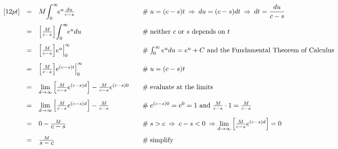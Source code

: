 \documentclass{article}
\theoremstyle{definition}
\begin{document}
\begin{equation*}
\begin{array}{lllll}
[12pt]                                                                                 %
&=&  M \mathlarger{\int}_0^\infty \! e^u \frac{du}{c-s}       &\quad  \mathrel{\#} u = (c-s)t  \: \Rightarrow \: du = (c-s) dt \: \Rightarrow \: dt = \dfrac{du}{c-s}                                                         \\     
[12pt]                                                                                %
&=& \Big [ \frac{M}{c-s} \Big ] \mathlarger{\int}_0^\infty \! e^u du                                    &\quad  \mathrel{\#} \text{neither $c$ or $s$ depends on $t$}                                                                \\     
[12pt]                                                                                %
&=& \Big [ \frac{M}{c-s} \Big ] e^u \Big |_0^\infty              &\quad  \mathrel{\#} \int_0^\infty e^u du = e^u +C \text{ and the Fundamental Theorem of Calculus}                                                  \\     
[12pt]                                                                                %
&=& \Big [ \frac{M}{c-s} \Big ]  e^{(c-s)t} \Big |_0^\infty     &\quad  \mathrel{\#} u = (c-s)t                                                                                                                                                                \\
[12pt]                                                                                %
&=& \lim\limits_{d \to \infty}\Big [\frac{M}{c-s} e^{(c-s)d} \Big ] - \frac{M}{c - s}e^{(c-s)0}  &\quad \mathrel{\#} \text{evaluate at the limits}                                                                                     \\
[12pt]                                                                                %
&=& \lim\limits_{d \to \infty}\Big [\frac{M}{c-s} e^{(c-s)d} \Big ] - \frac{M}{c - s}                 &\quad  \mathrel{\#} e^{(c-s)0} = e^0 = 1 \text{ and } \frac{M}{c-s} \cdot 1 = \frac{M}{c-s}                     \\
[12pt]                                                                                %
&=& 0 - \frac{M} {\mathlarger{c-s}}                                   &\quad  \mathrel{\#} s > c \: \Rightarrow \: c -s < 0 \: \Rightarrow  \lim\limits_{d \to \infty}\Big [\frac{M}{c-s} e^{(c-s)d} \Big ] = 0          \\    
[12pt]                                                                                %
&=& \frac{M}{\mathlarger{s-c}}                                         &\quad  \mathrel{\#} \text{simplify} 
\end{array}
\end{equation*}
\end{document}
